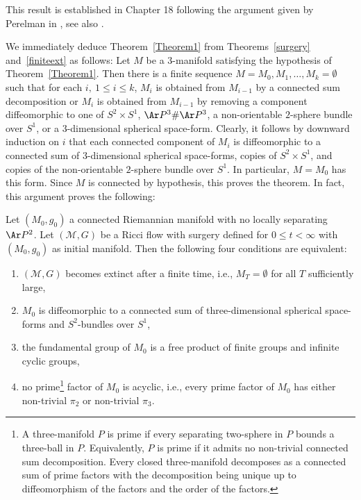 This result is established in Chapter 18 following the argument
given by Perelman in \cite{Perelman3}, see also
\cite{ColdingMinicozzi}.



We immediately deduce Theorem~\ref{Theorem1} from
Theorems~\ref{surgery} and~\ref{finiteext} as  follows: Let $M$ be a
$3$-manifold satisfying the hypothesis of Theorem~\ref{Theorem1}.
Then there is a finite sequence $M=M_0,M_1,\ldots,M_k=\emptyset$
such that for each $i,\ 1\le i\le k$, $M_i$ is obtained from
$M_{i-1}$ by  a connected sum decomposition or $M_i$ is obtained
from $M_{i-1}$ by removing  a component diffeomorphic to one of
$S^2\times S^1$, $\Ar P^3\#\Ar P^3$, a non-orientable $2$-sphere
bundle over $S^1$, or a $3$-dimensional spherical space-form.
Clearly, it follows by downward induction on $i$ that  each
connected component of $M_i$ is diffeomorphic to a connected sum of
$3$-dimensional spherical space-forms, copies of $S^2\times S^1$,
and copies of the non-orientable $2$-sphere bundle over $S^1$. In
particular, $M=M_0$ has this form. Since $M$ is connected by
hypothesis, this proves the theorem. In fact, this argument proves
the following:

\begin{corollary}
\label{cor:extinction-equivalence}\label{corequiv}
Let $(M_0,g_0)$ a connected Riemannian manifold with no locally
separating $\Ar P^2$. Let $({\mathcal M},G)$ be a Ricci flow with
surgery defined for $0\le t<\infty$ with $(M_0,g_0)$ as initial
manifold. Then the following four conditions are equivalent:
\begin{enumerate} \item[(1)] $({\mathcal M},G)$ becomes extinct after a
finite time, i.e., $M_T=\emptyset$ for all $T$ sufficiently large,
\item[(2)] $M_0$ is diffeomorphic to a connected sum of three-dimensional
spherical space-forms and $S^2$-bundles over $S^1$,\item[(3)] the
fundamental group of $M_0$ is a free product of finite groups and
infinite cyclic groups,
\item[(4)] no prime\footnote{A three-manifold $P$ is prime
if  every separating two-sphere in $P$ bounds a three-ball in $P$.
Equivalently, $P$ is prime if it admits no non-trivial connected sum
decomposition. Every closed three-manifold decomposes as a connected
sum of prime factors with the decomposition being unique up to
diffeomorphism of the factors and the order of the factors.} factor
of $M_0$ is acyclic, i.e., every prime factor of $M_0$ has either
non-trivial $\pi_2$ or non-trivial $\pi_3$.
\end{enumerate}
\end{corollary}

